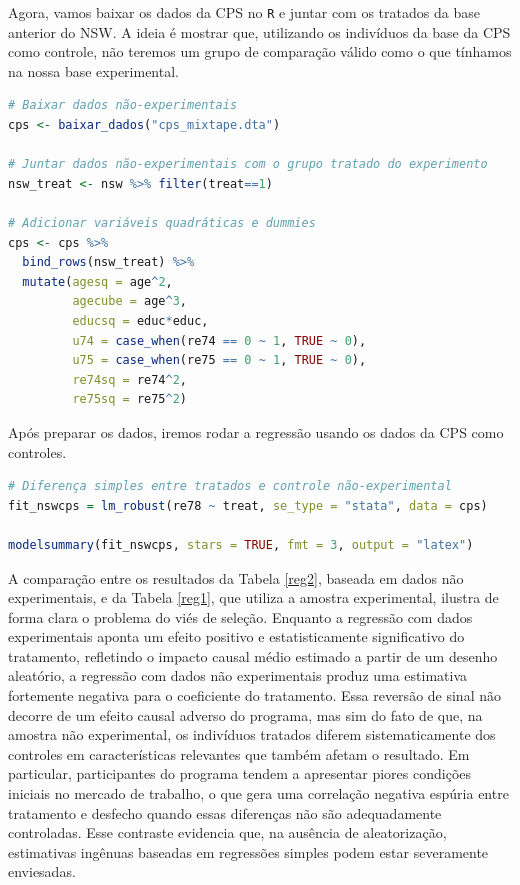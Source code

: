 Agora, vamos baixar os dados da CPS no \texttt{R} e juntar com os tratados da base anterior do NSW. A ideia é mostrar que, utilizando os indivíduos da base da CPS como controle, não teremos um grupo de comparação válido como o que tínhamos na nossa base experimental.

\begin{boxH}
\begin{lstlisting}[language = R]
# Baixar dados não-experimentais
cps <- baixar_dados("cps_mixtape.dta") 

# Juntar dados não-experimentais com o grupo tratado do experimento
nsw_treat <- nsw %>% filter(treat==1)

# Adicionar variáveis quadráticas e dummies
cps <- cps %>% 
  bind_rows(nsw_treat) %>% 
  mutate(agesq = age^2,
         agecube = age^3,
         educsq = educ*educ,
         u74 = case_when(re74 == 0 ~ 1, TRUE ~ 0),
         u75 = case_when(re75 == 0 ~ 1, TRUE ~ 0),
         re74sq = re74^2,
         re75sq = re75^2)
\end{lstlisting}
\end{boxH}

Após preparar os dados, iremos rodar a regressão usando os dados da CPS como controles. 

\begin{boxH}
\begin{lstlisting}[language = R]
# Diferença simples entre tratados e controle não-experimental
fit_nswcps = lm_robust(re78 ~ treat, se_type = "stata", data = cps)

modelsummary(fit_nswcps, stars = TRUE, fmt = 3, output = "latex")
\end{lstlisting}
\end{boxH}

A comparação entre os resultados da Tabela \ref{reg2}, baseada em dados não experimentais, e da Tabela \ref{reg1}, que utiliza a amostra experimental, ilustra de forma clara o problema do viés de seleção. Enquanto a regressão com dados experimentais aponta um efeito positivo e estatisticamente significativo do tratamento, refletindo o impacto causal médio estimado a partir de um desenho aleatório, a regressão com dados não experimentais produz uma estimativa fortemente negativa para o coeficiente do tratamento. Essa reversão de sinal não decorre de um efeito causal adverso do programa, mas sim do fato de que, na amostra não experimental, os indivíduos tratados diferem sistematicamente dos controles em características relevantes que também afetam o resultado. Em particular, participantes do programa tendem a apresentar piores condições iniciais no mercado de trabalho, o que gera uma correlação negativa espúria entre tratamento e desfecho quando essas diferenças não são adequadamente controladas. Esse contraste evidencia que, na ausência de aleatorização, estimativas ingênuas baseadas em regressões simples podem estar severamente enviesadas.

